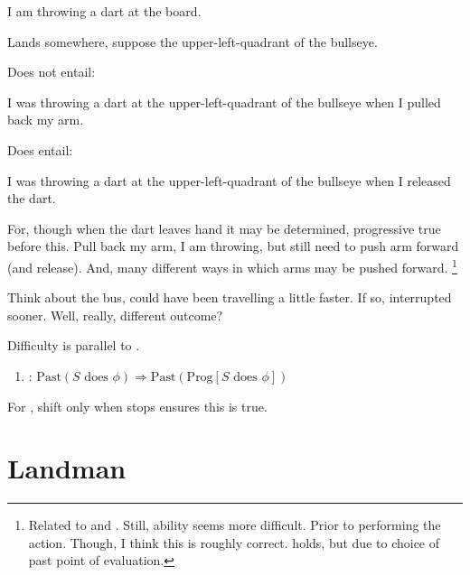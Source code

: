 \begin{note}
  \begin{illustration}
    I am throwing a dart at the board.

    Lands somewhere, suppose the upper-left-quadrant of the bullseye.

    Does not entail:

    I was throwing a dart at the upper-left-quadrant of the bullseye when I pulled back my arm.

    Does entail:

    I was throwing a dart at the upper-left-quadrant of the bullseye when I released the dart.
  \end{illustration}

  For, though when the dart leaves hand it may be determined, progressive true before this.
  Pull back my arm, I am throwing, but still need to push arm forward (and release).
  And, many different ways in which arms may be pushed forward.%
  \footnote{
    Related to \BoyVS{} and \BoyPS{}.
    Still, ability seems more difficult.
    Prior to performing the action.
    Though, I think this is roughly correct.
    \BoyPS{} holds, but due to choice of past point of evaluation.
  }

  Think about the bus, could have been travelling a little faster.
  If so, interrupted sooner.
  Well, really, different outcome?
\end{note}

\begin{note}
  Difficulty is parallel to \BoyPS{}.
  \begin{enumerate}[label=]
  \item
    \BoyPS{}: \(\text{Past}(S\text{ does }\phi) \Rightarrow \text{Past}(\text{Prog}[S\text{ does }\phi])\)
  \end{enumerate}
  For \citeauthor{Landman:1992wh}, shift only when stops ensures this is true.
\end{note}

\section{Landman}
\label{sec:landman}

